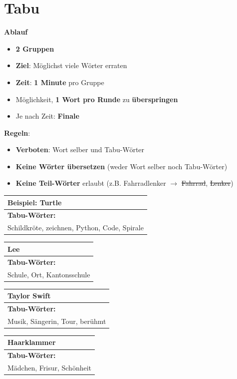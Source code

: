 
\pagestyle{empty}
\huge
\newcommand{\tabucard}[2]{
    \begin{center}
        \begin{tabular}{p{\columnwidth}}
            \toprule
            \textbf{\Huge #1} \\ \midrule\midrule
            \textbf{Tabu-Wörter:} \\
            #2 \vspace{0.2cm} \\ \bottomrule
        \end{tabular}
    \end{center}
    \newpage
}


\section*{\Huge Tabu}
\textbf{Ablauf}
\begin{itemize}
\item \textbf{2 Gruppen}
\item \textbf{Ziel}: Möglichst viele Wörter erraten
\item {} \textbf{Zeit}: \textbf{1 Minute} pro Gruppe 
\item Möglichkeit, \textbf{1 Wort pro Runde} zu \textbf{überspringen}
\item Je nach Zeit: \textbf{Finale} 
\end{itemize}

\textbf{Regeln}:
\begin{itemize}
\item \textbf{Verboten}: Wort selber und Tabu-Wörter
\item \textbf{Keine Wörter übersetzen} (weder Wort selber noch Tabu-Wörter)
\item \textbf{Keine Teil-Wörter} erlaubt (z.B. Fahrradlenker $\rightarrow$ \sout{Fahrrad}, \sout{Lenker})
\end{itemize}

\newpage


\tabucard{Beispiel: Turtle}{
Schildkröte, zeichnen, Python, Code, Spirale
}

\tabucard{Lee}{
Schule, Ort, Kantonsschule
}

\tabucard{Taylor Swift}{
Musik, Sängerin, Tour, berühmt
}

\tabucard{Haarklammer}{
Mädchen, Frisur, Schönheit
}


